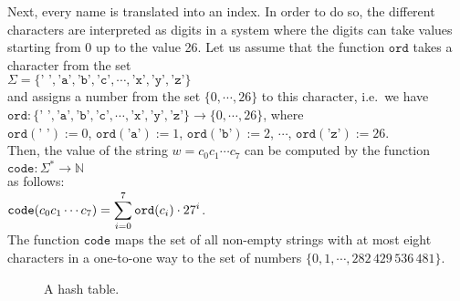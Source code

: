 Next, every name is translated into an index.  In order to do so, the different
characters are interpreted as digits in a system where the digits can take values starting
from 0 up to the value 26.
Let us assume that the function  $\texttt{ord}$ takes a character from the set
\\[0.2cm]
\hspace*{1.3cm}
$\Sigma = \{ \texttt{' '}, \texttt{'a'}, \texttt{'b'}, \texttt{'c'}, \cdots, \texttt{'x'}, \texttt{'y'}, \texttt{'z'} \}$ 
\\[0.2cm]
and assigns a number from the set $\{0,\cdots,26\}$ to this character, i.e.~we have \\[0.2cm]
\hspace*{1.3cm} 
$\texttt{ord}: \{ \texttt{' '}, \texttt{'a'}, \texttt{'b'}, \texttt{'c'}, \cdots, \texttt{'x'}, \texttt{'y'},
\texttt{'z'} \} \rightarrow \{0,\cdots, 26\}$, \quad where
\\[0.2cm]
\hspace*{1.3cm}
$\texttt{ord}(\texttt{' '}) := 0$, \quad
$\texttt{ord}(\texttt{'a'}) := 1$, \quad
$\texttt{ord}(\texttt{'b'}) := 2$, \quad $\cdots$, \quad
$\texttt{ord}(\texttt{'z'}) := 26$.
\\[0.2cm]
Then, the value of the string  $w = c_0c_1\cdots c_7$ can be computed by the function \\[0.2cm]
\hspace*{1.3cm} 
$\texttt{code}: \Sigma^* \rightarrow \mathbb{N}$ \\[0.2cm]
as follows: \\[0.2cm]
\hspace*{1.3cm} 
$\displaystyle \texttt{code}(c_0c_1\cdots c_7) = \sum\limits_{i=0}^7 \texttt{ord}(c_i) \cdot 27^i$.
\\[0.2cm]
The function $\texttt{code}$ maps the set of all non-empty strings with at most eight characters in a
one-to-one way to the set of numbers $\{0,1,\cdots, 282\,429\,536\,481 \}$.


\begin{figure}[!ht]
  \centering
  \caption{A hash table.}
  \label{fig:hash-example}
\end{figure}

